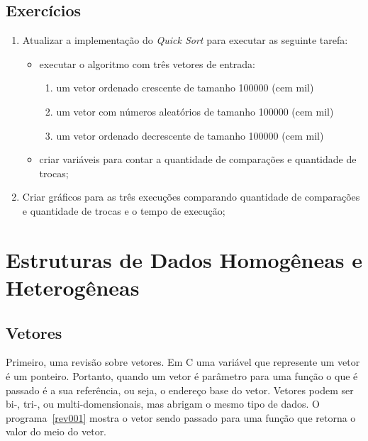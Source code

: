\documentclass[11pt,fleqn]{book} %
\begin{document}
\subsection*{Exercícios}
\begin{enumerate}
	\item Atualizar a implementação do \textit{Quick Sort} para executar as seguinte tarefa:
	\begin{itemize}
		\item executar o algoritmo com três vetores de entrada:
		\begin{enumerate}
			\item um vetor ordenado crescente de tamanho 100000 (cem mil)
			\item um vetor com números aleatórios de tamanho 100000 (cem mil)
			\item um vetor ordenado decrescente de tamanho 100000 (cem mil)
		\end{enumerate} 
		\item criar variáveis para contar a quantidade de comparações e quantidade de trocas;
	\end{itemize} 
	\item Criar gráficos para as três execuções comparando quantidade de comparações e quantidade de trocas e o tempo de execução;
\end{enumerate} 

\newpage
\section{Estruturas de Dados Homogêneas e Heterogêneas}\label{tipos}

\subsection*{Vetores}

Primeiro, uma revisão sobre vetores.
Em C uma variável que represente um vetor é um ponteiro.
Portanto, quando um vetor é parâmetro para uma função o que é passado é a sua referência, ou seja, o endereço base do vetor.
Vetores podem ser bi-, tri-, ou multi-domensionais, mas abrigam o mesmo tipo de dados.
O programa~\ref{rev001} mostra o vetor sendo passado para uma função que retorna o valor do meio do vetor.

\label{rev001}

\label{rev003}
\end{document}
